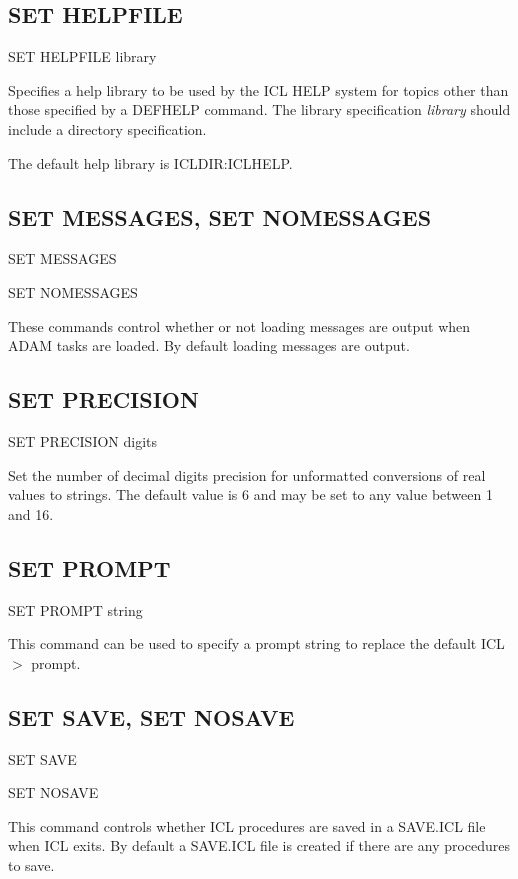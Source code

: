 \subsection{SET HELPFILE}

   SET HELPFILE library

Specifies a help library to be used by the ICL HELP system for topics other
than those specified by a DEFHELP command. The library specification 
{\em library} should include a directory specification.

The default help library is ICLDIR:ICLHELP.


\subsection{SET MESSAGES, SET NOMESSAGES}

   SET MESSAGES

   SET NOMESSAGES

These commands control whether or not loading messages are output when
ADAM tasks are loaded. By default loading messages are output.

\subsection{SET PRECISION}

   SET PRECISION \hspace{.5cm} digits

Set the number of decimal digits precision for unformatted conversions
of real values to strings. The default value is 6 and may be set to any 
value between 1 and 16.

\subsection{SET PROMPT}

   SET PROMPT \hspace{.5cm} string

This command can be used to specify a prompt string to replace the
default ICL$>$ prompt.
                                                             
\subsection{SET SAVE, SET NOSAVE}

   SET SAVE

   SET NOSAVE

This command controls whether ICL procedures are saved in a SAVE.ICL file
when ICL exits. By default a SAVE.ICL file is created if there are any
procedures to save. 

